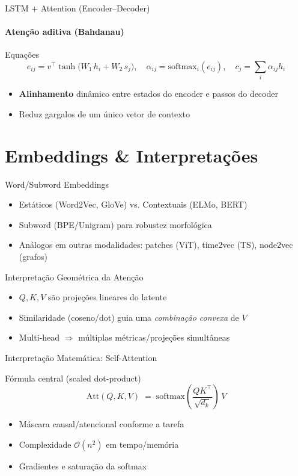 \documentclass{beamer}
\begin{document}
\begin{frame}{LSTM + Attention (Encoder--Decoder)}
	\framesubtitle{Atenção aditiva (Bahdanau)}
	\begin{block}{Equações}
		\small
		\[
			e_{ij} = v^\top \tanh\!\big(W_1\,h_i + W_2\,s_j\big), \quad
			\alpha_{ij} = \mathrm{softmax}_i(e_{ij}), \quad
			c_j = \sum_i \alpha_{ij} h_i
		\]
	\end{block}
	\begin{itemize}[<+->]
		\item \textbf{Alinhamento} dinâmico entre estados do encoder e passos do decoder
		\item Reduz gargalos de um único vetor de contexto
	\end{itemize}
\end{frame}

\section{Embeddings \& Interpretações}
\begin{frame}{Word/Subword Embeddings}
	\begin{itemize}[<+->]
		\item Estáticos (Word2Vec, GloVe) vs. Contextuais (ELMo, BERT)
		\item Subword (BPE/Unigram) para robustez morfológica
		\item Análogos em outras modalidades: patches (ViT), time2vec (TS), node2vec (grafos)
	\end{itemize}
\end{frame}

\begin{frame}{Interpretação Geométrica da Atenção}
	\begin{itemize}[<+->]
		\item $Q,K,V$ são projeções lineares do latente
		\item Similaridade (coseno/dot) guia uma \emph{combinação convexa} de $V$
		\item Multi-head $\Rightarrow$ múltiplas métricas/projeções simultâneas
	\end{itemize}
\end{frame}

\begin{frame}{Interpretação Matemática: Self-Attention}
	\begin{block}{Fórmula central (scaled dot-product)}
		\[
			\mathrm{Att}(Q,K,V) \;=\; \mathrm{softmax}\!\left(\frac{QK^\top}{\sqrt{d_k}}\right)\,V
		\]
	\end{block}
	\begin{itemize}[<+->]
		\item Máscara causal/atencional conforme a tarefa
		\item Complexidade $\mathcal{O}(n^2)$ em tempo/memória
		\item Gradientes e saturação da softmax
	\end{itemize}
\end{frame}
\end{document}
